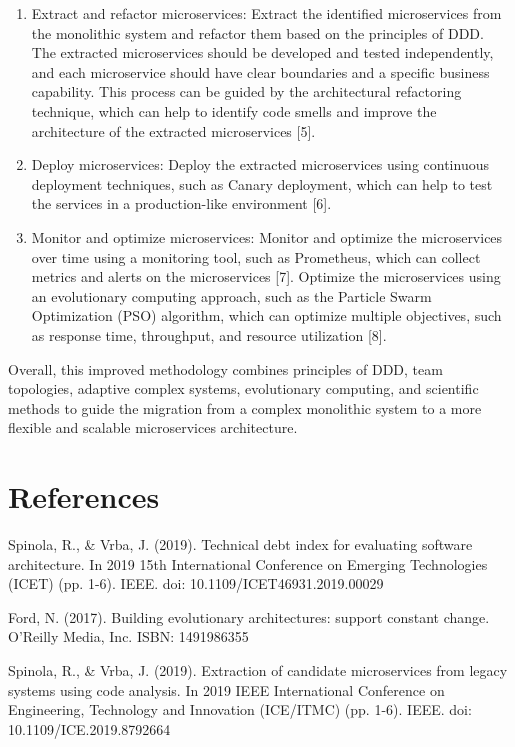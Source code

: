 \begin{enumerate}
\item Extract and refactor microservices: Extract the identified microservices from the monolithic system and refactor them based on the principles of DDD. The extracted microservices should be developed and tested independently, and each microservice should have clear boundaries and a specific business capability. This process can be guided by the architectural refactoring technique, which can help to identify code smells and improve the architecture of the extracted microservices [5].

\item Deploy microservices: Deploy the extracted microservices using continuous deployment techniques, such as Canary deployment, which can help to test the services in a production-like environment [6].

\item Monitor and optimize microservices: Monitor and optimize the microservices over time using a monitoring tool, such as Prometheus, which can collect metrics and alerts on the microservices [7]. Optimize the microservices using an evolutionary computing approach, such as the Particle Swarm Optimization (PSO) algorithm, which can optimize multiple objectives, such as response time, throughput, and resource utilization [8].
\end{enumerate}



Overall, this improved methodology combines principles of DDD, team topologies, adaptive complex systems, evolutionary computing, and scientific methods to guide the migration from a complex monolithic system to a more flexible and scalable microservices architecture.

\section{References}

Spinola, R., & Vrba, J. (2019). Technical debt index for evaluating software architecture. In 2019 15th International Conference on Emerging Technologies (ICET) (pp. 1-6). IEEE. doi: 10.1109/ICET46931.2019.00029

Ford, N. (2017). Building evolutionary architectures: support constant change. O'Reilly Media, Inc. ISBN: 1491986355

Spinola, R., & Vrba, J. (2019). Extraction of candidate microservices from legacy systems using code analysis. In 2019 IEEE International Conference on Engineering, Technology and Innovation (ICE/ITMC) (pp. 1-6). IEEE. doi: 10.1109/ICE.2019.8792664

